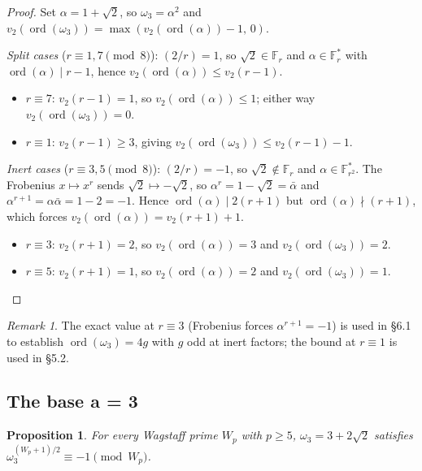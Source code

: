 \documentclass[12pt]{article}
\theoremstyle{plain}
\newtheorem{proposition}[theorem]{Proposition}
\theoremstyle{definition}
\theoremstyle{remark}
\newtheorem{remark}[theorem]{Remark}
\begin{document}
\begin{proof}
Set \(\alpha = 1+\sqrt{2}\), so \(\omega_3 = \alpha^2\) and
\(v_2(\operatorname{ord}(\omega_3)) = \max(v_2(\operatorname{ord}(\alpha))-1,\,0)\).

\emph{Split cases} (\(r \equiv 1, 7 \pmod{8}\)): \((2/r) = 1\), so
\(\sqrt{2} \in \mathbb{F}_r\) and \(\alpha \in \mathbb{F}_r^*\) with
\(\operatorname{ord}(\alpha) \mid r-1\), hence
\(v_2(\operatorname{ord}(\alpha)) \leq v_2(r-1)\).
\begin{itemize}
\item \(r \equiv 7\): \(v_2(r-1) = 1\), so \(v_2(\operatorname{ord}(\alpha)) \leq 1\);
  either way \(v_2(\operatorname{ord}(\omega_3)) = 0\).
\item \(r \equiv 1\): \(v_2(r-1) \geq 3\), giving
  \(v_2(\operatorname{ord}(\omega_3)) \leq v_2(r-1)-1\).
\end{itemize}

\emph{Inert cases} (\(r \equiv 3, 5 \pmod{8}\)): \((2/r) = -1\), so
\(\sqrt{2} \notin \mathbb{F}_r\) and \(\alpha \in \mathbb{F}_{r^2}^*\).
The Frobenius \(x \mapsto x^r\) sends \(\sqrt{2} \mapsto -\sqrt{2}\),
so \(\alpha^r = 1-\sqrt{2} = \bar{\alpha}\) and
\(\alpha^{r+1} = \alpha\bar{\alpha} = 1 - 2 = -1\). Hence
\(\operatorname{ord}(\alpha) \mid 2(r+1)\) but
\(\operatorname{ord}(\alpha) \nmid (r+1)\), which forces
\(v_2(\operatorname{ord}(\alpha)) = v_2(r+1) + 1\).
\begin{itemize}
\item \(r \equiv 3\): \(v_2(r+1) = 2\), so
  \(v_2(\operatorname{ord}(\alpha)) = 3\) and
  \(v_2(\operatorname{ord}(\omega_3)) = 2\).
\item \(r \equiv 5\): \(v_2(r+1) = 1\), so
  \(v_2(\operatorname{ord}(\alpha)) = 2\) and
  \(v_2(\operatorname{ord}(\omega_3)) = 1\).
\end{itemize}
\end{proof}

\begin{remark}
The exact value at \(r \equiv 3\) (Frobenius forces
\(\alpha^{r+1} = -1\)) is used in \S6.1 to establish
\(\operatorname{ord}(\omega_3) = 4g\) with \(g\) odd at
inert factors; the bound at \(r \equiv 1\) is used in \S5.2.
\end{remark}

\subsection{The base a = 3}


\begin{proposition}\label{prop:base-3}
For every Wagstaff prime \(W_p\) with \(p \geq 5\),
\(\omega_3 = 3 + 2\sqrt{2}\) satisfies
\(\omega_3^{(W_p+1)/2} \equiv -1 \pmod{W_p}\).
\end{proposition}
\end{document}
